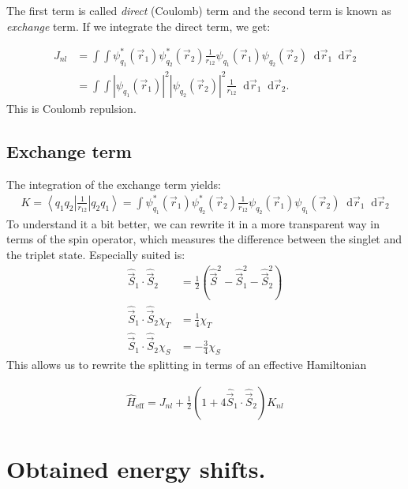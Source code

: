 \documentclass[10pt]{article}
\newcommand{\bra}[1]{\ensuremath{\left\langle#1\right|}}
\newcommand{\ket}[1]{\ensuremath{\left|#1\right\rangle}}
\newcommand*\dif{\mathop{}\!\mathrm{d}}
\begin{document}
The first term is called \emph{direct} (Coulomb) term and the second term is known as \emph{exchange} term. If we integrate the direct term, we get:

\begin{align}
J_{nl} &= \int \int \psi_{q_1}^*\left(\vec{r}_1\right) \psi_{q_2}^* \left(\vec{r}_2\right) \frac{1}{r_{12}} \psi_{q_1} \left(\vec{r}_1\right) \psi_{q_2} \left(\vec{r}_2\right) \dif \vec{r}_1 \dif \vec{r}_2 \\
&= \int \int \left| \psi_{q_1} \left(\vec{r}_1\right) \right|^2 \left| \psi_{q_2}\left(\vec{r}_2\right) \right|^2 \frac{1}{r_{12}} \dif \vec{r}_1 \dif \vec{r}_2.
\end{align}
This is Coulomb repulsion. 




\subsection{Exchange term}
The integration of the exchange term yields:
%
\begin{align}
K = \bra{q_1 q_2} \frac{1}{r_{12}} \ket{q_2 q_1} = \int \psi_{q_1}^* \left(\vec{r}_1\right) \psi_{q_2}^* \left( \vec{r}_2 \right) \frac{1}{r_{12}} \psi_{q_2}\left(\vec{r}_1\right) \psi_{q_1} \left( \vec{r}_2 \right) \dif \vec{r}_1 \dif \vec{r}_2
\end{align}
To understand it a bit better, we can rewrite it in a more transparent way in terms of the spin operator, which measures the difference between the singlet and the triplet state. Especially suited is:
\begin{align}
\hat{\vec{S}}_1 \cdot \hat{\vec{S}}_2 &= \frac{1}{2} \left(\hat{\vec{S}}^2 - \hat{\vec{S}}_1^2 - \hat{\vec{S}}_2^2 \right)\\
\hat{\vec{S}}_1 \cdot \hat{\vec{S}}_2 \chi_T &= \frac{1}{4} \chi_T\\
\hat{\vec{S}}_1 \cdot \hat{\vec{S}}_2 \chi_S &= -\frac{3}{4} \chi_S
\end{align}
This allows us to rewrite the splitting in terms of an effective Hamiltonian

\begin{align}
\hat{H}_\text{eff} = J_{nl} + \frac{1}{2}\left(1+ 4\hat{\vec{S}}_1 \cdot \hat{\vec{S}}_2\right) K_{nl}
\end{align}

\section{Obtained energy shifts.}
\end{document}
